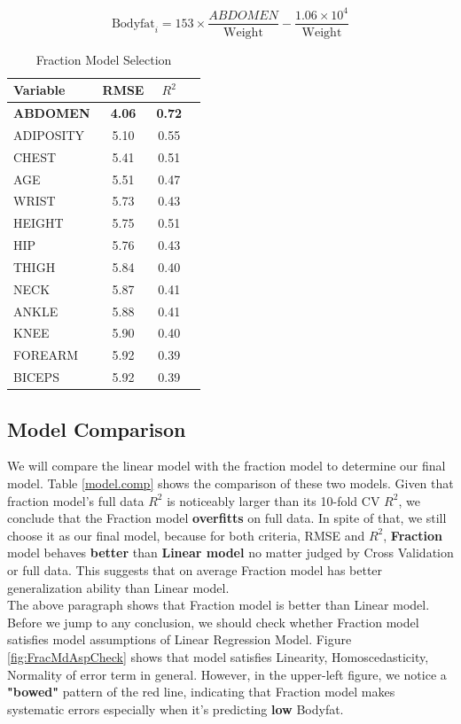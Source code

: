 \documentclass[11pt, twocolumn]{article}
\begin{document}
$$\text{Bodyfat}_i = 153 \times \frac{ABDOMEN}{ \text{Weight} }
				 - \frac{1.06 \times 10^4}{ \text{Weight} }$$

 \begin{table}[]
    \centering
    \begin{tabular}{l|ccc}
        \hline
         Variable & RMSE & $R^2$ \\
         \hline
         \textbf{ABDOMEN} & \textbf{4.06} & \textbf{0.72} \\
         ADIPOSITY & 5.10 & 0.55 \\
         CHEST & 5.41 & 0.51 \\
         AGE & 5.51 & 0.47 \\
         WRIST & 5.73 & 0.43 \\
         HEIGHT & 5.75 & 0.51 \\
         HIP & 5.76 & 0.43 \\
         THIGH & 5.84 & 0.40 \\
         NECK & 5.87 & 0.41 \\
         ANKLE & 5.88 & 0.41 \\
         KNEE & 5.90 & 0.40 \\
         FOREARM & 5.92 & 0.39 \\
         BICEPS & 5.92 & 0.39 \\
         \hline
    \end{tabular}
    \caption{Fraction Model Selection}
    \label{frac.cv}
\end{table}



\subsection{Model Comparison}

We will compare the linear model with the fraction model to determine our final model. Table \ref{model.comp} shows the comparison of these two models. Given that fraction model's full data $R^2$ is noticeably larger than its 10-fold CV $R^2$, we conclude that the Fraction model \textbf{overfitts} on full data. In spite of that, we still choose it as our final model, because for both criteria, RMSE and $R^2$, \textbf{Fraction} model behaves \textbf{better} than \textbf{Linear model} no matter judged by Cross Validation or full data. This suggests that on average Fraction model has better generalization ability than Linear model. \\

The above paragraph shows that Fraction model is better than Linear model. Before we jump to any conclusion, we should check whether Fraction model satisfies model assumptions of Linear Regression Model. Figure \ref{fig:FracMdAspCheck} shows that model satisfies Linearity, Homoscedasticity, Normality of error term in general. However, in the upper-left figure, we notice a \textbf{"bowed"} pattern of the red line, indicating that Fraction model makes systematic errors especially when it's predicting \textbf{low} Bodyfat.
\end{document}
